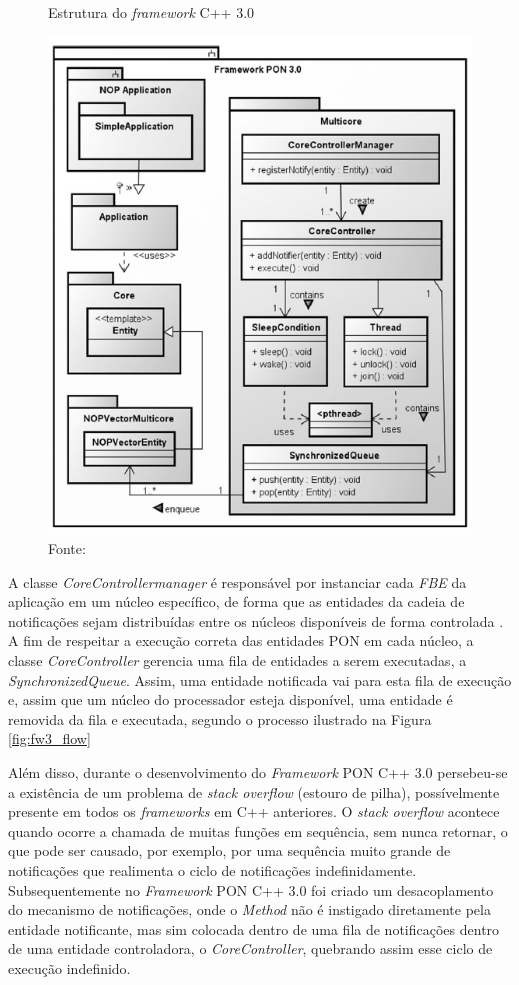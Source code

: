 \begin{figure}[!htb]
  \centering
  \caption{Estrutura do \textit{framework} C++ 3.0} \includegraphics[width=.65\textwidth]{../figures/fw_30.png}
  \caption*{Fonte:
    }
  \label{fig:fw3_struct}
\end{figure}

A classe \textit{CoreControllermanager} é responsável por instanciar cada
\textit{FBE} da aplicação em um núcleo específico, de forma que as entidades da
cadeia de notificações sejam distribuídas entre os núcleos disponíveis de forma
controlada \cite{doc_Schutz_2019}. A fim de respeitar a execução correta das
entidades PON em cada núcleo, a classe \textit{CoreController} gerencia uma fila
de entidades a serem executadas, a \textit{SynchronizedQueue}. Assim, uma
entidade notificada vai para esta fila de execução e, assim que um núcleo do
processador esteja disponível, uma entidade é removida da fila e executada,
segundo o processo ilustrado na Figura \ref{fig:fw3_flow}

Além disso, durante o desenvolvimento do \textit{Framework} PON C++ 3.0
persebeu-se a existência de um problema de \textit{stack overflow} (estouro de
pilha), possívelmente presente em todos os \textit{frameworks} em C++
anteriores. O \textit{stack overflow} acontece quando ocorre a chamada de muitas
funções em sequência, sem nunca retornar, o que pode ser causado, por exemplo,
por uma sequência muito grande de notificações que realimenta o ciclo de
notificações indefinidamente. Subsequentemente no \textit{Framework} PON C++ 3.0
foi criado um desacoplamento do mecanismo de notificações, onde o
\textit{Method} não é instigado diretamente pela entidade notificante, mas sim
colocada dentro de uma fila de notificações dentro de uma entidade controladora,
o \textit{CoreController}, quebrando assim esse ciclo de execução indefinido.

